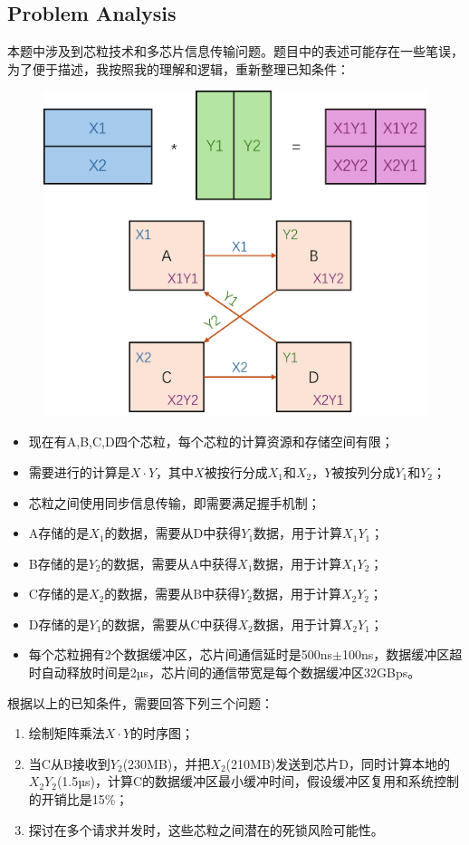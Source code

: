 \documentclass[11pt, a4 paper]{article}
\begin{document}
\subsection{Problem Analysis}
本题中涉及到芯粒技术和多芯片信息传输问题。题目中的表述可能存在一些笔误，为了便于描述，我按照我的理解和逻辑，重新整理已知条件：
\begin{figure}[h]
    \centering
    \includegraphics[width=0.7\linewidth]{image/problem5_1.png}
\end{figure}
\begin{itemize}
    \item 现在有A,B,C,D四个芯粒，每个芯粒的计算资源和存储空间有限；
    \item 需要进行的计算是$X \cdot Y$，其中$X$被按行分成$X_1$和$X_2$，$Y$被按列分成$Y_1$和$Y_2$；
    \item 芯粒之间使用同步信息传输，即需要满足握手机制；
    \item A存储的是$X_1$的数据，需要从D中获得$Y_1$数据，用于计算$X_1Y_1$；
    \item B存储的是$Y_2$的数据，需要从A中获得$X_1$数据，用于计算$X_1Y_2$；
    \item C存储的是$X_2$的数据，需要从B中获得$Y_2$数据，用于计算$X_2Y_2$；
    \item D存储的是$Y_1$的数据，需要从C中获得$X_2$数据，用于计算$X_2Y_1$；
    \item 每个芯粒拥有2个数据缓冲区，芯片间通信延时是500ns$\pm$100ns，数据缓冲区超时自动释放时间是2µs，芯片间的通信带宽是每个数据缓冲区32GBps。
\end{itemize}
根据以上的已知条件，需要回答下列三个问题：
\begin{enumerate}[nosep]
    \item 绘制矩阵乘法$X \cdot Y$的时序图；
    \item 当C从B接收到$Y_2$(230MB)，并把$X_2$(210MB)发送到芯片D，同时计算本地的$X_2Y_2$(1.5µs)，计算C的数据缓冲区最小缓冲时间，假设缓冲区复用和系统控制的开销比是15\%；
    \item 探讨在多个请求并发时，这些芯粒之间潜在的死锁风险可能性。
\end{enumerate}
\end{document}
